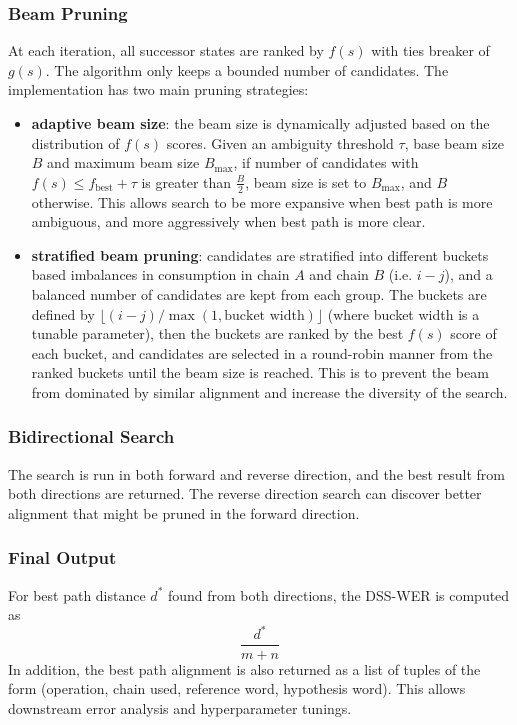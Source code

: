 \subsubsection{Beam Pruning}
At each iteration, all successor states are ranked by $f(s)$ with ties breaker of $g(s)$. The algorithm only keeps a bounded number of candidates. The implementation has two main pruning strategies:
\begin{itemize}
    \item \textbf{adaptive beam size}: the beam size is dynamically adjusted based on the distribution of $f(s)$ scores. Given an ambiguity threshold $\tau$, base beam size $B$ and maximum beam size $B_\mathrm{max}$, if number of candidates with $f(s) \le f_\mathrm{best} + \tau$ is greater than $\frac{B}{2}$, beam size is set to $B_\mathrm{max}$, and $B$ otherwise. This allows search to be more expansive when best path is more ambiguous, and more aggressively when best path is more clear.
    \item \textbf{stratified beam pruning}: candidates are stratified into different buckets based imbalances in consumption in chain $A$ and chain $B$ (i.e. $i-j$), and a balanced number of candidates are kept from each group. The buckets are defined by $\lfloor (i-j) / \max(1, \text{bucket width})\rfloor$ (where bucket width is a tunable parameter), then the buckets are ranked by the best $f(s)$ score of each bucket, and candidates are selected in a round-robin manner from the ranked buckets until the beam size is reached. This is to prevent the beam from dominated by similar alignment and increase the diversity of the search.
\end{itemize}

\subsubsection{Bidirectional Search}
The search is run in both forward and reverse direction, and the best result from both directions are returned. The reverse direction search can discover better alignment that might be pruned in the forward direction.

\subsubsection{Final Output}
For best path distance $d^*$ found from both directions, the DSS-WER is computed as
\begin{equation}
\frac{d^*}{m+n}
\end{equation}
In addition, the best path alignment is also returned as a list of tuples of the form (operation, chain used, reference word, hypothesis word). This allows downstream error analysis and hyperparameter tunings.

